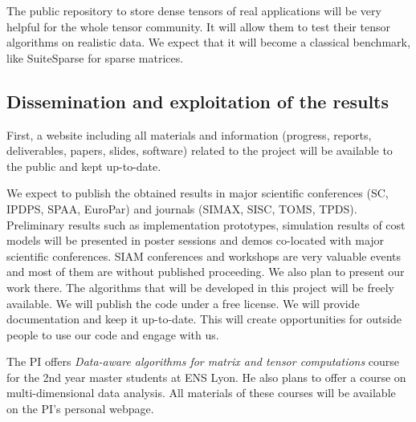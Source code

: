 \documentclass[a4paper,11pt]{article}
\begin{document}
	The public repository to store dense tensors of real applications will be very helpful for the whole tensor community. It will allow them to test their tensor algorithms on realistic data. We expect that it will become a classical benchmark, like SuiteSparse for sparse matrices.
	
	
	
	\subsection*{Dissemination and exploitation of the results}
	
	First, a website including all materials and information (progress, reports, deliverables, papers, slides, software) related to the project will be available to the public and kept up-to-date.
	
	
	We expect to publish the obtained results in major scientific conferences (SC, IPDPS, SPAA, EuroPar) and journals (SIMAX, SISC, TOMS, TPDS). Preliminary results such as implementation prototypes, simulation results of cost models will be presented in poster sessions and demos co-located with major scientific conferences. SIAM conferences and workshops are very valuable events and most of them are without published proceeding. We also plan to present our work there. The algorithms that will be developed in this project will be freely available. We will publish the code under a free license. We will provide documentation and keep it up-to-date. This will create opportunities for outside people to use our code and engage with us.
	
	The PI offers  \emph{Data-aware algorithms for matrix and tensor computations} course for the 2nd year master students at ENS Lyon. He also plans to offer a course on multi-dimensional data analysis. All materials of these courses will be available on the PI's personal webpage.
	

	
	{\footnotesize
		
		
	}
	
\end{document}
